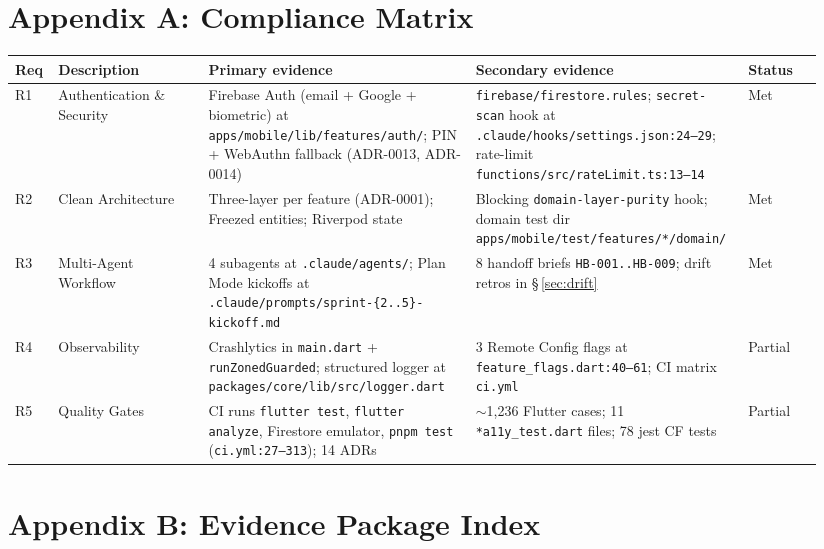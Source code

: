 \documentclass[11pt,a4paper]{article}
\begin{document}
\section*{Appendix A: Compliance Matrix}

{\scriptsize
\renewcommand{\arraystretch}{1.20}
\begin{longtable}{@{}p{0.05\linewidth} p{0.18\linewidth} p{0.32\linewidth} p{0.30\linewidth} p{0.09\linewidth}@{}}
\toprule
\textbf{Req} & \textbf{Description} & \textbf{Primary evidence} & \textbf{Secondary evidence} & \textbf{Status} \\
\midrule
\endhead
R1 & Authentication \& Security &
  Firebase Auth (email + Google + biometric) at \texttt{apps/mobile/lib/features/auth/}; PIN + WebAuthn fallback (ADR-0013, ADR-0014) &
  \texttt{firebase/firestore.rules}; \texttt{secret-scan} hook at \texttt{.claude/hooks/settings.json:24--29}; rate-limit \texttt{functions/src/rateLimit.ts:13--14} &
  Met \\
R2 & Clean Architecture &
  Three-layer per feature (ADR-0001); Freezed entities; Riverpod state &
  Blocking \texttt{domain-layer-purity} hook; domain test dir \texttt{apps/mobile/test/features/*/domain/} &
  Met \\
R3 & Multi-Agent Workflow &
  4 subagents at \texttt{.claude/agents/}; Plan Mode kickoffs at \texttt{.claude/prompts/sprint-\{2..5\}-kickoff.md} &
  8 handoff briefs \texttt{HB-001..HB-009}; drift retros in \S\,\ref{sec:drift} &
  Met \\
R4 & Observability &
  Crashlytics in \texttt{main.dart} + \texttt{runZonedGuarded}; structured logger at \texttt{packages/core/lib/src/logger.dart} &
  3 Remote Config flags at \texttt{feature\_flags.dart:40--61}; CI matrix \texttt{ci.yml} &
  Partial \\
R5 & Quality Gates &
  CI runs \texttt{flutter test}, \texttt{flutter analyze}, Firestore emulator, \texttt{pnpm test} (\texttt{ci.yml:27--313}); 14 ADRs &
  $\sim$1{,}236 Flutter cases; 11 \texttt{*a11y\_test.dart} files; 78 jest CF tests &
  Partial \\
\bottomrule
\end{longtable}
}

\section*{Appendix B: Evidence Package Index}
\end{document}
